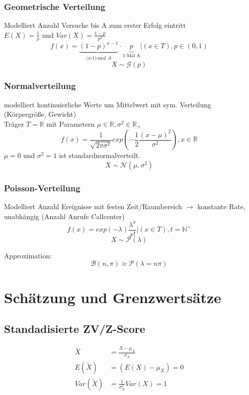 \documentclass[10pt,a4paper,landscape]{article}
\begin{document}
\begin{multicols}{4}
\subsubsection{Geometrische Verteilung}
Modelliert Anzahl Versuche bis A zum erster Erfolg eintritt\\
$E(X)=\frac{1}{p}$ und $Var(X)=\frac{1-p}{p^2}$
\[
f(x)= \underbrace{(1 - p)^{x-1}}_{\text{(x-1)-mal } \overline{A}}
 \cdot \underbrace{p}_{\text{1-Mal A}}|(x \in T), p \in (0,1)
\]
\[
X \sim \mathcal{G}(p)
\]

\subsubsection{Normalverteilung}
modelliert kontinuierliche Werte um Mittelwert mit sym. Verteilung (Körpergröße, Gewicht) \\
Träger $T=\mathbb{R}$ mit Parametern $\mu \in \mathbb{R}, \sigma^2 \in \mathbb{R}_+$
\[
f(x)=\frac{1}{\sqrt{2 \pi \sigma^2}}exp\left(-\frac{1}{2}\frac{(x-\mu)^2}{\sigma^2}\right), x\in \mathbb{R}
\]
$\mu = 0$ und $\sigma^2 = 1$ ist standardnormalverteilt.
\[
X \sim \mathcal{N}(\mu , \sigma^2)
\]

\subsubsection{Poisson-Verteilung}
Modelliert Anzahl Ereignisse mit festen Zeit/Raumbereich $\rightarrow$ konstante Rate, unabhängig (Anzahl Anrufe Callcenter)
\[
f(x)=exp(-\lambda)\frac{\lambda^x}{x!}|(x \in T), t= \mathbb{N^+}
\]
\[
X \sim \mathcal{P}(\lambda)
\]

Approximation:
\[
\mathcal{B}(n, \pi) \approx \mathcal{P}(\lambda =n\pi)
\]


\section{Schätzung und Grenzwertsätze}

\subsection{Standadisierte ZV/Z-Score}
\begin{align*}
\tilde{X} &= \frac{X- \mu_X}{\sigma_X} \\
E(\tilde{X}) &= (E(X)-\mu_X)=0 \\
Var(\tilde{X})&=\frac{1}{\sigma^2_X}Var(X) = 1
\end{align*}


\end{multicols}
\end{document}
